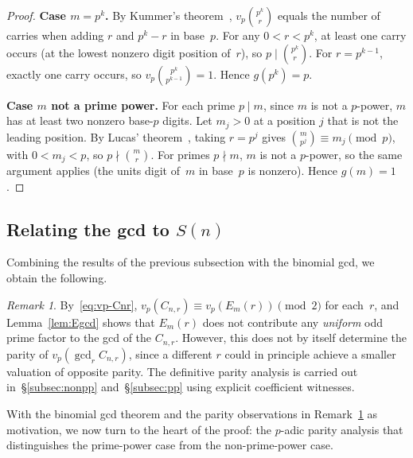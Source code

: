 \documentclass[10pt]{amsart}
\theoremstyle{definition}
\theoremstyle{remark}
\newtheorem*{remark}{Remark}
\begin{document}
\begin{proof}
\textbf{Case $m = p^k$.}
By Kummer's theorem~\cite{Kummer1852}, $v_p\binom{p^k}{r}$ equals the
number of carries when adding $r$ and $p^k - r$ in base~$p$.  For any
$0 < r < p^k$, at least one carry occurs (at the lowest nonzero
digit position of~$r$), so $p \mid \binom{p^k}{r}$.  For $r = p^{k-1}$,
exactly one carry occurs, so $v_p\binom{p^k}{p^{k-1}} = 1$.  Hence
$g(p^k) = p$.

\textbf{Case $m$ not a prime power.}
For each prime $p \mid m$, since $m$ is not a $p$-power, $m$ has at least
two nonzero base-$p$ digits.  Let $m_j > 0$ at a position $j$ that is not
the leading position.  By Lucas' theorem~\cite{Lucas1878}, taking $r = p^j$
gives $\binom{m}{p^j} \equiv m_j \pmod{p}$, with $0 < m_j < p$, so
$p \nmid \binom{m}{r}$.  For primes $p \nmid m$, $m$ is not a $p$-power,
so the same argument applies (the units digit of~$m$ in base~$p$ is
nonzero).  Hence $g(m) = 1$.
\end{proof}

\subsection{Relating the gcd to $S(n)$}

Combining the results of the previous subsection with the binomial gcd, we obtain the following.

\begin{remark}\label{rem:Cnr-parity}
By~\eqref{eq:vp-Cnr}, $v_p(C_{n,r}) \equiv v_p(E_m(r)) \pmod{2}$ for
each~$r$, and Lemma~\ref{lem:Egcd} shows that $E_m(r)$ does not
contribute any \emph{uniform} odd prime factor to the gcd of the
$C_{n,r}$.  However, this does not by itself determine the parity of
$v_p(\gcd_r C_{n,r})$, since a different $r$ could in principle achieve
a smaller valuation of opposite parity.  The definitive parity analysis
is carried out in~\S\ref{subsec:nonpp} and~\S\ref{subsec:pp} using
explicit coefficient witnesses.
\end{remark}

With the binomial gcd theorem and the parity observations in
Remark~\ref{rem:Cnr-parity} as motivation, we now turn to the heart of
the proof: the $p$-adic parity analysis that distinguishes the prime-power
case from the non-prime-power case.

\end{document}
